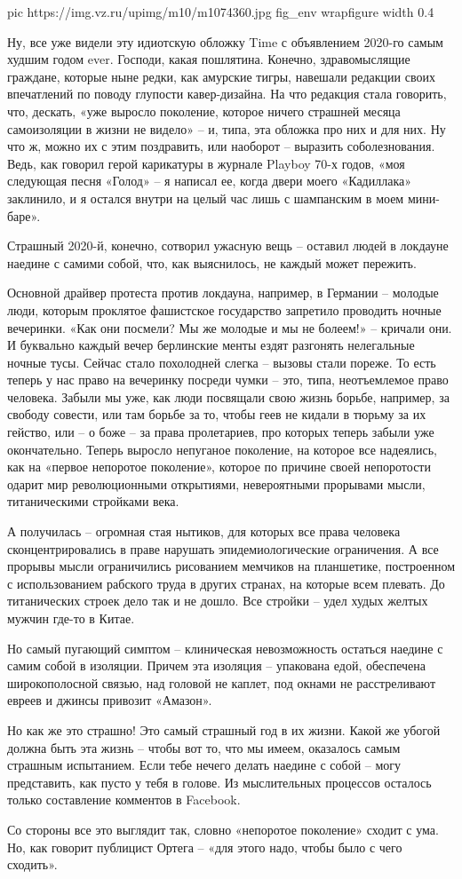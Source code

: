 \ifcmt
pic https://img.vz.ru/upimg/m10/m1074360.jpg
fig_env wrapfigure
width 0.4
\fi

Ну, все уже видели эту идиотскую обложку Time с объявлением 2020-го самым
худшим годом ever. Господи, какая пошлятина. Конечно, здравомыслящие граждане,
которые ныне редки, как амурские тигры, навешали редакции своих впечатлений по
поводу глупости кавер-дизайна. На что редакция стала говорить, что, дескать,
«уже выросло поколение, которое ничего страшней месяца самоизоляции в жизни не
видело» – и, типа, эта обложка про них и для них. Ну что ж, можно их с этим
поздравить, или наоборот – выразить соболезнования. Ведь, как говорил герой
карикатуры в журнале Playboy 70-х годов, «моя следующая песня «Голод» – я
написал ее, когда двери моего «Кадиллака» заклинило, и я остался внутри на
целый час лишь с шампанским в моем мини-баре». 

Страшный 2020-й, конечно, сотворил ужасную вещь – оставил людей в локдауне
наедине с самими собой, что, как выяснилось, не каждый может пережить. 

Основной драйвер протеста против локдауна, например, в Германии – молодые люди,
которым проклятое фашистское государство запретило проводить ночные вечеринки.
«Как они посмели? Мы же молодые и мы не болеем!» – кричали они. И буквально
каждый вечер берлинские менты ездят разгонять нелегальные ночные тусы. Сейчас
стало похолодней слегка – вызовы стали пореже. То есть теперь у нас право на
вечеринку посреди чумки – это, типа, неотъемлемое право человека. Забыли мы
уже, как люди посвящали свою жизнь борьбе, например, за свободу совести, или
там борьбе за то, чтобы геев не кидали в тюрьму за их гейство, или – о боже –
за права пролетариев, про которых теперь забыли уже окончательно. Теперь
выросло непуганое поколение, на которое все надеялись, как на «первое непоротое
поколение», которое по причине своей непоротости одарит мир революционными
открытиями, невероятными прорывами мысли, титаническими стройками века.

А получилась – огромная стая нытиков, для которых все права человека
сконцентрировались в праве нарушать эпидемиологические ограничения. А все
прорывы мысли ограничились рисованием мемчиков на планшетике, построенном с
использованием рабского труда в других странах, на которые всем плевать. До
титанических строек дело так и не дошло. Все стройки – удел худых желтых мужчин
где-то в Китае. 

Но самый пугающий симптом – клиническая невозможность остаться наедине с самим
собой в изоляции. Причем эта изоляция – упакована едой, обеспечена
широкополосной связью, над головой не каплет, под окнами не расстреливают
евреев и джинсы привозит «Амазон».

Но как же это страшно! Это самый страшный год в их жизни. Какой же убогой
должна быть эта жизнь – чтобы вот то, что мы имеем, оказалось самым страшным
испытанием. Если тебе нечего делать наедине с собой – могу представить, как
пусто у тебя в голове. Из мыслительных процессов осталось только составление
комментов в Facebook.  

Со стороны все это выглядит так, словно «непоротое поколение» сходит с ума. Но,
как говорит публицист Ортега – «для этого надо, чтобы было с чего сходить». 
